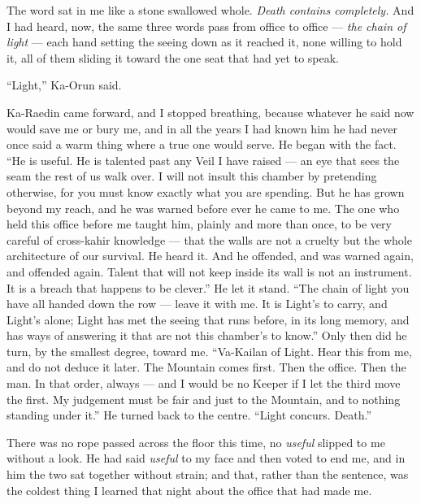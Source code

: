 The word sat in me like a stone swallowed whole. \emph{Death contains completely.} And I had heard, now, the same three words pass from office to office --- \emph{the chain of light} --- each hand setting the seeing down as it reached it, none willing to hold it, all of them sliding it toward the one seat that had yet to speak.\par

``Light,'' Ka-Orun said.\par

Ka-Raedin came forward, and I stopped breathing, because whatever he said now would save me or bury me, and in all the years I had known him he had never once said a warm thing where a true one would serve. He began with the fact. ``He is useful. He is talented past any Veil I have raised --- an eye that sees the seam the rest of us walk over. I will not insult this chamber by pretending otherwise, for you must know exactly what you are spending. But he has grown beyond my reach, and he was warned before ever he came to me. The one who held this office before me taught him, plainly and more than once, to be very careful of cross-kahir knowledge --- that the walls are not a cruelty but the whole architecture of our survival. He heard it. And he offended, and was warned again, and offended again. Talent that will not keep inside its wall is not an instrument. It is a breach that happens to be clever.'' He let it stand. ``The chain of light you have all handed down the row --- leave it with me. It is Light's to carry, and Light's alone; Light has met the seeing that runs before, in its long memory, and has ways of answering it that are not this chamber's to know.'' Only then did he turn, by the smallest degree, toward me. ``Va-Kailan of Light. Hear this from me, and do not deduce it later. The Mountain comes first. Then the office. Then the man. In that order, always --- and I would be no Keeper if I let the third move the first. My judgement must be fair and just to the Mountain, and to nothing standing under it.'' He turned back to the centre. ``Light concurs. Death.''\par

There was no rope passed across the floor this time, no \emph{useful} slipped to me without a look. He had said \emph{useful} to my face and then voted to end me, and in him the two sat together without strain; and that, rather than the sentence, was the coldest thing I learned that night about the office that had made me.\par

